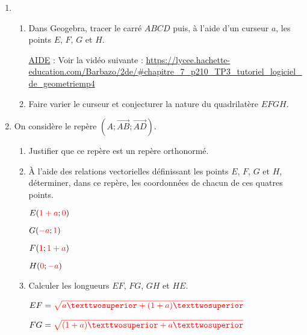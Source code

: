 \documentclass[
	classe=$2^{de}$
]{informatique}
\newcommand{\Point}[3]{#1(\correctionOr{{\color{red}#2}}{\phantom{3333}};\correctionOr{{\color{red}#3}}{\phantom{3333}})}
\begin{document}
\begin{enumerate}
	\item \begin{enumerate}
		      \item Dans Geogebra, tracer le carré $ABCD$ puis, à l'aide d'un curseur $a$, les points $E$, $F$, $G$ et $H$.

		            \begin{tcolorbox}
			            \uline{AIDE} : Voir la vidéo suivante : \url{https://lycee.hachette-education.com/Barbazo/2de/#chapitre_7_p210_TP3_tutoriel_logiciel_de_geometriemp4}
		            \end{tcolorbox}
		      \item Faire varier le curseur et conjecturer la nature du quadrilatère $EFGH$.

	      \end{enumerate}
	\item On considère le repère $(A ; \vec{AB}; \vec{AD})$.

	      \begin{enumerate}
		      \item Justifier que ce repère est un repère orthonormé.

		      \item À l'aide des relations vectorielles définissant les points $E$, $F$, $G$ et $H$, déterminer, dans ce repère, les coordonnées de chacun de ces quatres points.

		            \begin{center}
			            \begin{multicols}{2}
				            $\Point{E}{1+a}{0}$

				            $\Point{G}{-a}{1}$

				            \columnbreak

				            $\Point{F}{1}{1+a}$

				            $\Point{H}{0}{-a}$
			            \end{multicols}
		            \end{center}
		      \item Calculer les longueurs $EF$, $FG$, $GH$ et $HE$.

		            $EF = \correction{\sqrt{a² + (1 + a)²}}$ \medskip

		            $FG = \correction{\sqrt{(1 + a)² + a²} }$ \medskip


\end{enumerate}
\end{enumerate}
\end{document}
